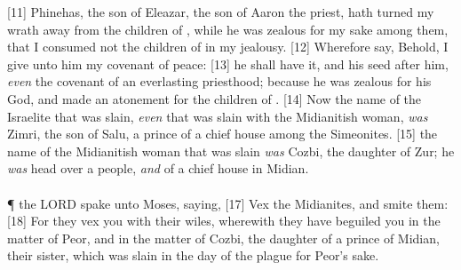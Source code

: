 [11] \textcolor[cmyk]{0.99998,1,0,0}{Phinehas, the son of Eleazar, the son of Aaron the priest, hath turned my wrath away from the children of , while he was zealous for my sake among them, that I consumed not the children of  in my jealousy.}
[12] \textcolor[cmyk]{0.99998,1,0,0}{Wherefore say, Behold, I give unto him my covenant of peace:}
[13] \textcolor[cmyk]{0.99998,1,0,0}{ he shall have it, and his seed after him, \emph{even} the covenant of an everlasting priesthood; because he was zealous for his God, and made an atonement for the children of .}
[14] \textcolor[cmyk]{0.99998,1,0,0}{Now the name of the Israelite that was slain, \emph{even} that was slain with the Midianitish woman, \emph{was} Zimri, the son of Salu, a prince of a chief house among the Simeonites.}
[15] \textcolor[cmyk]{0.99998,1,0,0}{ the name of the Midianitish woman that was slain \emph{was} Cozbi, the daughter of Zur; he \emph{was} head over a people, \emph{and} of a chief house in Midian.}\\
\\
\P \textcolor[cmyk]{0.99998,1,0,0}{ the LORD spake unto Moses, saying,}
[17] \textcolor[cmyk]{0.99998,1,0,0}{Vex the Midianites, and smite them:}
[18] \textcolor[cmyk]{0.99998,1,0,0}{For they vex you with their wiles, wherewith they have beguiled you in the matter of Peor, and in the matter of Cozbi, the daughter of a prince of Midian, their sister, which was slain in the day of the plague for Peor's sake.}
